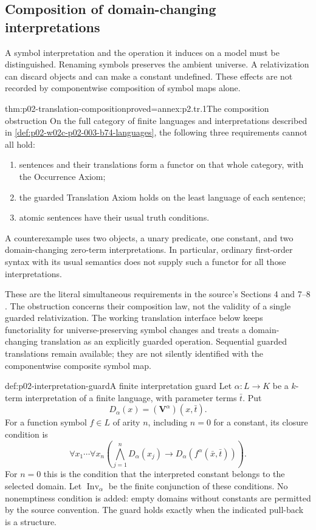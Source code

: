 \subsection{Composition of domain-changing interpretations}
\label{sec:p02-translation-composition}

A symbol interpretation and the operation it induces on a model must be
distinguished. Renaming symbols preserves the ambient universe. A
relativization can discard objects and can make a constant undefined.
These effects are not recorded by componentwise composition of symbol
maps alone.

\begin{hbtheorem}{thm:p02-translation-composition}{proved=annex:p2.tr.1}{The composition obstruction}
On the full category of finite languages and interpretations described
in \cref{def:p02-w02c-p02-003-b74-languages}, the following three
requirements cannot all hold:
\begin{enumerate}
\item sentences and their translations form a functor on that whole
      category, with the Occurrence Axiom;
\item the guarded Translation Axiom holds on the least language of
      each sentence;
\item atomic sentences have their usual truth conditions.
\end{enumerate}
A counterexample uses two objects, a unary predicate, one constant,
and two domain-changing zero-term interpretations. In particular,
ordinary first-order syntax with its usual semantics does not supply
such a functor for all those interpretations.
\end{hbtheorem}

These are the literal simultaneous requirements in the source's
Sections 4 and 7--8
\cite[pp.~229--230, 234--238]{Barwise1974Axioms}. The obstruction concerns
their composition law, not the validity of a single guarded
relativization. The working translation interface below keeps
functoriality for universe-preserving symbol changes and treats a
domain-changing translation as an explicitly guarded operation.
Sequential guarded translations remain available; they are not silently
identified with the componentwise composite symbol map.

\begin{hbdefinition}{def:p02-interpretation-guard}{A finite interpretation guard}
Let \(\alpha:L\to K\) be a \(k\)-term interpretation of a finite
language, with parameter terms \(\bar t\). Put
\[
 D_\alpha(x)=(\mathbf V^\alpha)(x,\bar t).
\]
For a function symbol \(f\in L\) of arity \(n\), including \(n=0\)
for a constant, its closure condition is
\[
 \forall x_1\cdots\forall x_n
 \left(\bigwedge_{j=1}^{n}D_\alpha(x_j)
       \longrightarrow D_\alpha(f^\alpha(\bar x,\bar t))\right).
\]
For \(n=0\) this is the condition that the interpreted constant belongs
to the selected domain. Let \(\operatorname{Inv}_\alpha\) be the finite
conjunction of these conditions. No nonemptiness condition is added:
empty domains without constants are permitted by the source convention.
The guard holds exactly when the indicated pull-back is a structure.
\end{hbdefinition}

